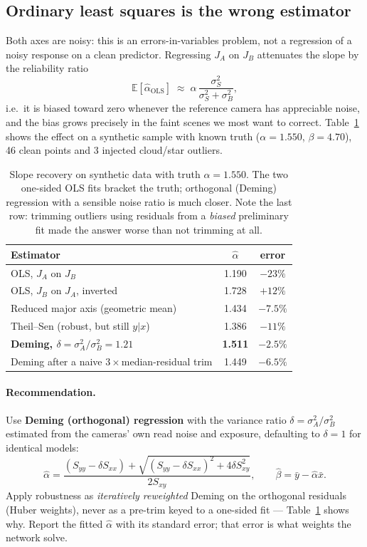 \documentclass[11pt,a4paper]{article}
\begin{document}
\subsection{Ordinary least squares is the wrong estimator}

Both axes are noisy: this is an errors-in-variables problem, not a regression of
a noisy response on a clean predictor. Regressing $J_A$ on $J_B$ attenuates the
slope by the reliability ratio
\begin{equation}
  \mathbb{E}[\hat\alpha_{\text{OLS}}] \;\approx\;
  \alpha\,\frac{\sigma_S^2}{\sigma_S^2+\sigma_B^2},
\end{equation}
i.e.\ it is biased toward zero whenever the reference camera has appreciable
noise, and the bias grows precisely in the faint scenes we most want to
correct. Table~\ref{tab:estimators} shows the effect on a synthetic sample with
known truth ($\alpha=1.550$, $\beta=4.70$), 46 clean points and 3 injected
cloud/star outliers.

\begin{table}[h]
\centering
\begin{tabular}{lcc}
\toprule
Estimator & $\hat\alpha$ & error \\
\midrule
OLS, $J_A$ on $J_B$              & 1.190 & $-23\%$ \\
OLS, $J_B$ on $J_A$, inverted    & 1.728 & $+12\%$ \\
Reduced major axis (geometric mean) & 1.434 & $-7.5\%$ \\
Theil--Sen (robust, but still $y|x$) & 1.386 & $-11\%$ \\
\textbf{Deming, $\delta=\sigma_A^2/\sigma_B^2=1.21$} & \textbf{1.511} & $\mathbf{-2.5\%}$ \\
Deming after a naive $3\times$median-residual trim & 1.449 & $-6.5\%$ \\
\bottomrule
\end{tabular}
\caption{Slope recovery on synthetic data with truth $\alpha=1.550$. The two
one-sided OLS fits bracket the truth; orthogonal (Deming) regression with a
sensible noise ratio is much closer. Note the last row: trimming outliers using
residuals from a \emph{biased} preliminary fit made the answer worse than not
trimming at all.}
\label{tab:estimators}
\end{table}

\paragraph{Recommendation.} Use \textbf{Deming (orthogonal) regression} with the
variance ratio $\delta=\sigma_A^2/\sigma_B^2$ estimated from the cameras' own
read noise and exposure, defaulting to $\delta=1$ for identical models:
\begin{equation}
  \hat\alpha=\frac{(S_{yy}-\delta S_{xx})+\sqrt{(S_{yy}-\delta S_{xx})^2+4\delta S_{xy}^2}}{2S_{xy}},
  \qquad \hat\beta=\bar y-\hat\alpha\bar x .
\end{equation}
Apply robustness as \emph{iteratively reweighted} Deming on the orthogonal
residuals (Huber weights), never as a pre-trim keyed to a one-sided fit ---
Table~\ref{tab:estimators} shows why. Report the fitted $\hat\alpha$ with its
standard error; that error is what weights the network solve.
\end{document}
